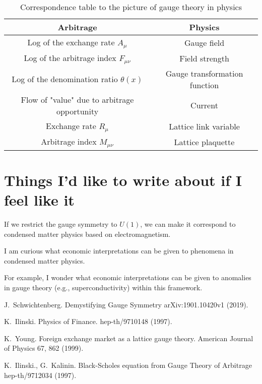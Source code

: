 \documentclass[uplatex]{jsarticle}
\begin{document}
\begin{table}[H]
	\centering
	\begin{tabular}{|c|c|}
		\hline
		\textbf{Arbitrage} & \textbf{Physics} \\ \hline \hline
		Log of the exchange rate $A_{\mu}$ & Gauge field \\ \hline
		Log of the arbitrage index $F_{\mu \nu}$ & Field strength \\ \hline
		Log of the denomination ratio $\theta(x)$ & Gauge transformation function \\ \hline
		Flow of "value" due to arbitrage opportunity & Current \\ \hline
		Exchange rate $R_{\mu}$ & Lattice link variable \\ \hline
		Arbitrage index $M_{\mu \nu}$ & Lattice plaquette \\ \hline
	\end{tabular}
	\caption{Correspondence table to the picture of gauge theory in physics}
	\label{tab:tab202502281751}
\end{table}


\section{\textbf{Things I'd like to write about if I feel like it}}

If we restrict the gauge symmetry to $U(1)$, we can make it correspond to condensed matter physics based on electromagnetism.

I am curious what economic interpretations can be given to phenomena in condensed matter physics.

For example, I wonder what economic interpretations can be given to anomalies in gauge theory (e.g., superconductivity) within this framework.

\begin{thebibliography}{9}

	J.~Schwichtenberg.
	\newblock Demystifying Gauge Symmetry
	\newblock arXiv:1901.10420v1 (2019).

	K.~Ilinski.
	\newblock Physics of Finance.
	\newblock hep-th/9710148 (1997).

	K.~Young.
	\newblock Foreign exchange market as a lattice gauge theory.
	\newblock American Journal of Physics 67, 862 (1999).

	K.~Ilinski., G.~Kalinin.
	\newblock Black-Scholes equation from Gauge Theory of Arbitrage
	\newblock hep-th/9712034 (1997).

\end{thebibliography}
\end{document}
